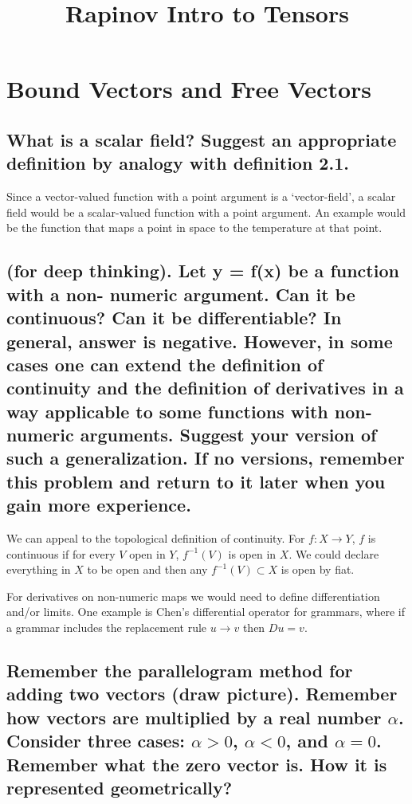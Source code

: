 \documentclass{article}
\title{Rapinov Intro to Tensors}
\author{}
\date{}
\begin{document}
\maketitle
\setcounter{section}{1}
\section{Bound Vectors and Free Vectors}
\subsection{What is a scalar field? Suggest an appropriate definition by analogy with definition 2.1.}

Since a vector-valued function with a point argument is a `vector-field', a scalar field would be a scalar-valued function with a point argument. An example would be the function that maps a point in space to the temperature at that point.

\subsection{(for deep thinking). Let y = f(x) be a function with a non- numeric argument. Can it be continuous? Can it be differentiable? In general, answer is negative. However, in some cases one can extend the definition of continuity and the definition of derivatives in a way applicable to some functions with non-numeric arguments. Suggest your version of such a generalization. If no versions, remember this problem and return to it later when you gain more experience.}

We can appeal to the topological definition of continuity. For $f: X \longrightarrow Y$, $f$ is continuous if for every $V$ open in $Y$, $f^{-1}(V)$ is open in $X$. We could declare everything in $X$ to be open and then any $f^{-1}(V) \subset X$ is open by fiat. 

For derivatives on non-numeric maps we would need to define differentiation and/or limits. One example is Chen's differential operator for grammars, where if a grammar includes the replacement rule $u \rightarrow v$ then $Du = v$.

\subsection{Remember the parallelogram method for adding two vectors (draw picture). Remember how vectors are multiplied by a real number $\alpha$. Consider three cases: $\alpha> 0$, $\alpha < 0$, and $\alpha = 0$. Remember what the zero vector is. How it is represented geometrically?}
\end{document}
